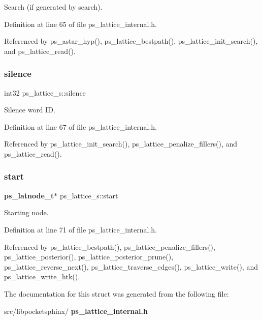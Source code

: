 Search (if generated by search). 



Definition at line 65 of file ps\+\_\+lattice\+\_\+internal.\+h.



Referenced by ps\+\_\+astar\+\_\+hyp(), ps\+\_\+lattice\+\_\+bestpath(), ps\+\_\+lattice\+\_\+init\+\_\+search(), and ps\+\_\+lattice\+\_\+read().

\mbox{\label{structps__lattice__s_acd3f3ab2649f649ba33bf2a422cf12b8}} 
\subsubsection{silence}
{\footnotesize\ttfamily int32 ps\+\_\+lattice\+\_\+s\+::silence}



Silence word ID. 



Definition at line 67 of file ps\+\_\+lattice\+\_\+internal.\+h.



Referenced by ps\+\_\+lattice\+\_\+init\+\_\+search(), ps\+\_\+lattice\+\_\+penalize\+\_\+fillers(), and ps\+\_\+lattice\+\_\+read().

\mbox{\label{structps__lattice__s_a5d936695a3813e117d20b585d48db8fe}} 
\subsubsection{start}
{\footnotesize\ttfamily \textbf{ ps\+\_\+latnode\+\_\+t}$\ast$ ps\+\_\+lattice\+\_\+s\+::start}



Starting node. 



Definition at line 71 of file ps\+\_\+lattice\+\_\+internal.\+h.



Referenced by ps\+\_\+lattice\+\_\+bestpath(), ps\+\_\+lattice\+\_\+penalize\+\_\+fillers(), ps\+\_\+lattice\+\_\+posterior(), ps\+\_\+lattice\+\_\+posterior\+\_\+prune(), ps\+\_\+lattice\+\_\+reverse\+\_\+next(), ps\+\_\+lattice\+\_\+traverse\+\_\+edges(), ps\+\_\+lattice\+\_\+write(), and ps\+\_\+lattice\+\_\+write\+\_\+htk().



The documentation for this struct was generated from the following file\+:\begin{DoxyCompactItemize}
\item 
src/libpocketsphinx/\textbf{ ps\+\_\+lattice\+\_\+internal.\+h}\end{DoxyCompactItemize}
